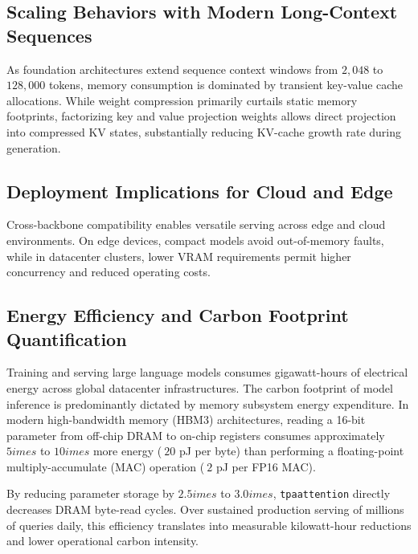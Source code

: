 \subsection{Scaling Behaviors with Modern Long-Context Sequences}
As foundation architectures extend sequence context windows from $2{,}048$ to $128{,}000$ tokens, memory consumption is dominated by transient key-value cache allocations. While weight compression primarily curtails static memory footprints, factorizing key and value projection weights allows direct projection into compressed KV states, substantially reducing KV-cache growth rate during generation.

\subsection{Deployment Implications for Cloud and Edge}
Cross-backbone compatibility enables versatile serving across edge and cloud environments. On edge devices, compact models avoid out-of-memory faults, while in datacenter clusters, lower VRAM requirements permit higher concurrency and reduced operating costs.

\subsection{Energy Efficiency and Carbon Footprint Quantification}
Training and serving large language models consumes gigawatt-hours of electrical energy across global datacenter infrastructures. The carbon footprint of model inference is predominantly dictated by memory subsystem energy expenditure. In modern high-bandwidth memory (HBM3) architectures, reading a 16-bit parameter from off-chip DRAM to on-chip registers consumes approximately $5	imes$ to $10	imes$ more energy ($~20$ pJ per byte) than performing a floating-point multiply-accumulate (MAC) operation ($~2$ pJ per FP16 MAC).

By reducing parameter storage by $2.5	imes$ to $3.0	imes$, \texttt{tpaattention} directly decreases DRAM byte-read cycles. Over sustained production serving of millions of queries daily, this efficiency translates into measurable kilowatt-hour reductions and lower operational carbon intensity.
